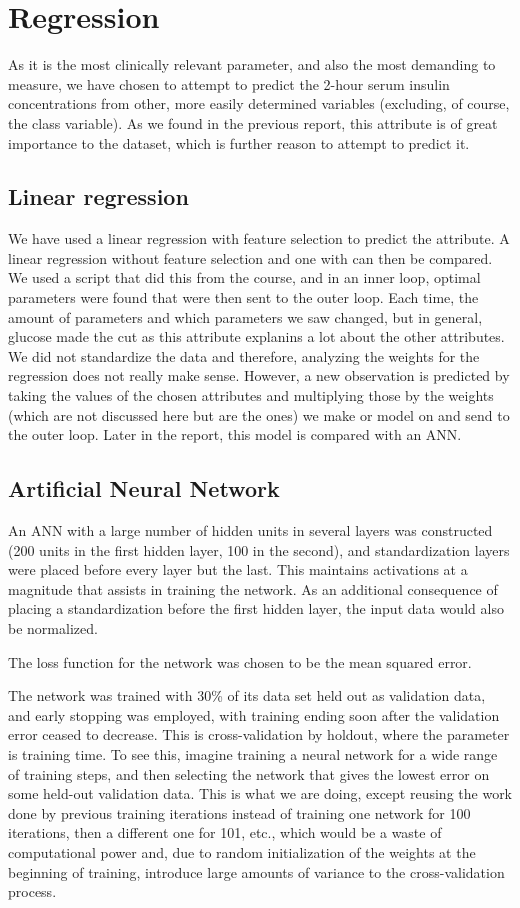 \section{Regression}
As it is the most clinically relevant parameter,
and also the most demanding to measure,
we have chosen to attempt to predict the 2-hour serum insulin concentrations
from other, more easily determined variables
(excluding, of course, the class variable).
As we found in the previous report,
this attribute is of great importance to the dataset,
which is further reason to attempt to predict it.

\subsection{Linear regression}
We have used a linear regression with feature selection to predict the attribute.
A linear regression without feature selection and one with can then be compared. We
used a script that did this from the course, and in an inner loop, optimal parameters
were found that were then sent to the outer loop. Each time, the amount of parameters
and which parameters we saw changed, but in general, glucose made the cut as this attribute
explanins a lot about the other attributes. We did not standardize the data and therefore,
analyzing the weights for the regression does not really make sense. However, a new
observation is predicted by taking the values of the chosen
attributes and multiplying those by the weights (which are not discussed here but are the ones)
we make or model on and send to the outer loop.
Later in the report, this model is compared with 
an ANN.
\subsection{Artificial Neural Network}
An ANN with a large number of hidden units in several layers was constructed
(200 units in the first hidden layer, 100 in the second),
and standardization layers were placed before every layer but the last.
This maintains activations at a magnitude that assists in training the network.
As an additional consequence of placing a standardization before the first hidden layer,
the input data would also be normalized.

The loss function for the network was chosen to be the mean squared error.

The network was trained with 30\% of its data set held out as validation data,
and early stopping was employed, with training ending soon after the validation error
ceased to decrease.
This is cross-validation by holdout,
where the parameter is training time.
To see this,
imagine training a neural network for a wide range of training steps,
and then selecting the network that gives the lowest error
on some held-out validation data.
This is what we are doing,
except reusing the work done by previous training iterations
instead of training one network for 100 iterations,
then a different one for 101, etc.,
which would be a waste of computational power
and, due to random initialization of the weights at the beginning of training,
introduce large amounts of variance to the cross-validation process.

